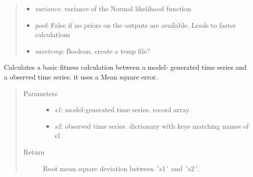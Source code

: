 \documentclass[a4paper,10pt,english]{sphinxmanual}
\begin{document}
\begin{fulllineitems}
\begin{fulllineitems}
\begin{quote}
\begin{description}
\begin{itemize}
\item {} 
\emph{variance}: variance of the Normal likelihood function

\item {} 
\emph{pool}: False if no priors on the outputs are available. Leads to faster calculations

\item {} 
\emph{savetemp}: Boolean. create a temp file?

\end{itemize}

\end{description}\end{quote}

\end{fulllineitems}


\end{fulllineitems}


\begin{fulllineitems}
\label{BIP.Bayes:BIP.Bayes.Melding.basicfit}
Calculates a basic fitness calculation between a model-
generated time series and a observed time series.
it uses a Mean square error.
\begin{quote}\begin{description}
\item[{Parameters}] \leavevmode\begin{itemize}
\item {} 
\emph{s1}: model-generated time series. record array.

\item {} 
\emph{s2}: observed time series. dictionary with keys matching names of s1

\end{itemize}

\item[{Return}] \leavevmode
Root mean square deviation between ´s1´ and ´s2´.

\end{description}\end{quote}

\end{fulllineitems}

\end{document}
